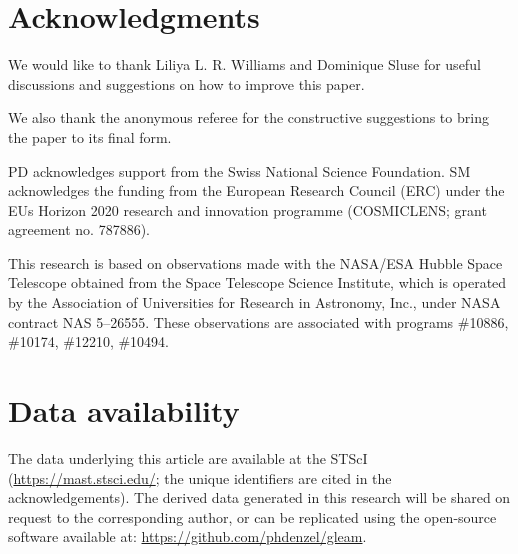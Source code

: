 \clearpage



  











\section*{Acknowledgments}

  We would like to thank Liliya L. R. Williams and Dominique Sluse for useful
  discussions and suggestions on how to improve this paper.

  We also thank the anonymous referee for the constructive suggestions to
  bring the paper to its final form.

  PD acknowledges support from the Swiss National Science Foundation.  SM
  acknowledges the funding from the European Research Council (ERC) under the
  EUs Horizon 2020 research and innovation programme (COSMICLENS; grant
  agreement no. 787886).

  This research is based on observations made with the NASA/ESA Hubble Space
  Telescope obtained from the Space Telescope Science Institute, which is
  operated by the Association of Universities for Research in Astronomy, Inc.,
  under NASA contract NAS 5–26555. These observations are associated with
  programs \#10886, \#10174, \#12210, \#10494.

\section*{Data availability}
  The data underlying this article are available at the STScI
  (\href{https://mast.stsci.edu/}{https://mast.stsci.edu/}; the unique
  identifiers are cited in the acknowledgements).  The derived data generated in
  this research will be shared on request to the corresponding author, or can be
  replicated using the open-source software available at:
  \faGithub\;\href{https://github.com/phdenzel/gleam}{https://github.com/phdenzel/gleam}.



